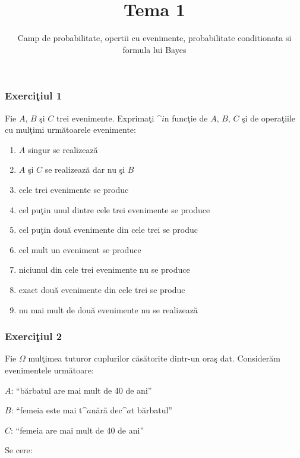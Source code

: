 \documentclass[]{article}
\title{Tema 1}
\subtitle{Camp de probabilitate, opertii cu evenimente, probabilitate conditionata
si formula lui Bayes}
\author{}
\date{}
\def\Om{\Omega}
\begin{document}
\maketitle

\thispagestyle{fancy}

\subsubsection{\texorpdfstring{Exerci\c tiul
1}{Exerciiul 1}}\label{exerciiul-1}

Fie \(A\), \(B\) \c si \(C\) trei evenimente. Exprima\c ti \(\^ i\)n
func\c tie de \(A\), \(B\), \(C\) \c si de opera\c tiile cu mul\c timi
urm\u atoarele evenimente:

\begin{enumerate}
\def\labelenumi{\alph{enumi})}
\item
  \(A\) singur se realizeaz\u a
\item
  \(A\) \c si \(C\) se realizeaz\u a dar nu \c si \(B\)
\item
  cele trei evenimente se produc
\item
  cel pu\c tin unul dintre cele trei evenimente se produce
\item
  cel pu\c tin dou\u a evenimente din cele trei se produc
\item
  cel mult un eveniment se produce
\item
  niciunul din cele trei evenimente nu se produce
\item
  exact dou\u a evenimente din cele trei se produc
\item
  nu mai mult de dou\u a evenimente nu se realizeaz\u a
\end{enumerate}

\subsubsection{\texorpdfstring{Exerci\c tiul
2}{Exerciiul 2}}\label{exerciiul-2}

Fie \(\Om\) mul\c timea tuturor cuplurilor c\u as\u atorite dintr-un
ora\c s dat. Consider\u am evenimentele urm\u atoare:

\(A\): ``b\u arbatul are mai mult de 40 de ani''

\(B\): ``femeia este mai t\(\^ a\)n\u ar\u a dec\(\^ a\)t b\u arbatul''

\(C\): ``femeia are mai mult de 40 de ani''

Se cere:
\end{document}
